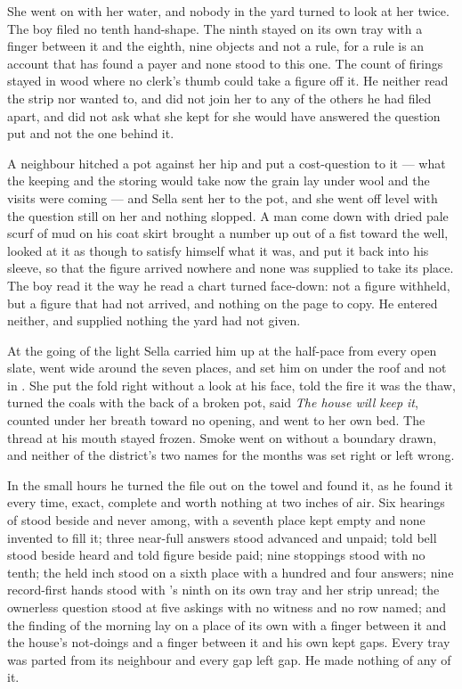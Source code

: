 She went on with her water, and nobody in the yard turned to look at her twice. The boy filed no tenth hand-shape. The ninth stayed on its own tray with a finger between it and the eighth, nine objects and not a rule, for a rule is an account that has found a payer and none stood to this one. The count of firings stayed in wood where no clerk's thumb could take a figure off it. He neither read the strip nor wanted to, and did not join her to any of the others he had filed apart, and did not ask what she kept for she would have answered the question put and not the one behind it.

A neighbour hitched a pot against her hip and put a cost-question to it --- what the keeping and the storing would take now the grain lay under wool and the visits were coming --- and Sella sent her to the pot, and she went off level with the question still on her and nothing slopped. A man come down  with dried pale scurf of mud on his coat skirt brought a number up out of a fist toward the well, looked at it as though to satisfy himself what it was, and put it back into his sleeve, so that the figure arrived nowhere and none was supplied to take its place. The boy read it the way he read a chart turned face-down: not a figure withheld, but a figure that had not arrived, and nothing on the page to copy. He entered neither, and supplied nothing the yard had not given.

At the going of the light Sella carried him up at the half-pace from every open slate, went wide around the seven places, and set him on  under the roof and not in . She put the fold right without a look at his face, told the fire it was the thaw, turned the coals with the back of a broken pot, said \emph{The house will keep it}, counted under her breath toward no opening, and went to her own bed. The thread at his mouth stayed frozen. Smoke went on without a boundary drawn, and neither of the district's two names for the months was set right or left wrong.

In the small hours he turned the file out on the towel and found it, as he found it every time, exact, complete and worth nothing at two inches of air. Six hearings of  stood beside and never among, with a seventh place kept empty and none invented to fill it; three near-full answers stood advanced and unpaid; told bell stood beside heard and told figure beside paid; nine stoppings stood with no tenth; the held inch stood on a sixth place with a hundred and four answers; nine record-first hands stood with 's ninth on its own tray and her strip unread; the ownerless question stood at five askings with no witness and no row named; and the finding of the morning lay on a place of its own with a finger between it and the house's not-doings and a finger between it and his own kept gaps. Every tray was parted from its neighbour and every gap left gap. He made nothing of any of it.

